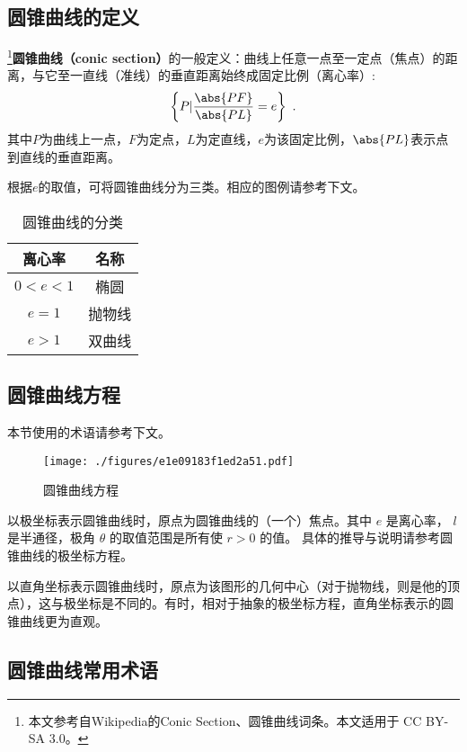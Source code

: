 
\begin{issues}
\issueDraft
\end{issues}

\subsection{圆锥曲线的定义}
\footnote{本文参考自Wikipedia的Conic Section、圆锥曲线词条。本文适用于 CC BY-SA 3.0。}\textbf{圆锥曲线（conic section）}的一般定义：曲线上任意一点至一定点（焦点）的距离，与它至一直线（准线）的垂直距离始终成固定比例（离心率）:
\begin{equation}
\left \{P \vert \frac{\abs{PF}}{\abs{PL}}=e \right \}~.
\end{equation}
其中$P$为曲线上一点，$F$为定点，$L$为定直线，$e$为该固定比例，$\abs{PL}$表示点到直线的垂直距离。

根据$e$的取值，可将圆锥曲线分为三类。相应的图例请参考下文。
\begin{table}[ht]
\centering
\caption{圆锥曲线的分类}\label{tab_conic_2}
\begin{tabular}{|c|c|}
\hline
离心率 & 名称\\
\hline
$0<e<1$ & 椭圆\\
\hline
$e=1$ & 抛物线\\
\hline
$e>1$ & 双曲线\\
\hline
\end{tabular}
\end{table}

\subsection{圆锥曲线方程}
本节使用的术语请参考下文。
\begin{figure}[ht]
\centering
\texttt{[image: ./figures/e1e09183f1ed2a51.pdf]}
\caption{圆锥曲线方程} \label{fig_conic_1}
\end{figure}

以极坐标表示圆锥曲线时，原点为圆锥曲线的（一个）焦点。其中 $e$ 是离心率， $l$ 是半通径，极角 $\theta$ 的取值范围是所有使 $r>0$ 的值。 
具体的推导与说明请参考圆锥曲线的极坐标方程。

以直角坐标表示圆锥曲线时，原点为该图形的几何中心（对于抛物线，则是他的顶点），这与极坐标是不同的。有时，相对于抽象的极坐标方程，直角坐标表示的圆锥曲线更为直观。

\subsection{圆锥曲线常用术语}

